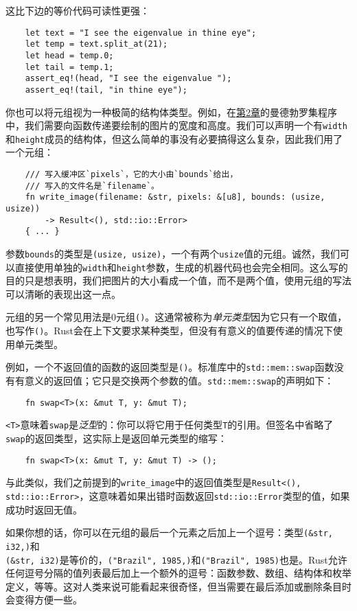 这比下边的等价代码可读性更强：
\begin{verbatim}
    let text = "I see the eigenvalue in thine eye";
    let temp = text.split_at(21);
    let head = temp.0;
    let tail = temp.1;
    assert_eq!(head, "I see the eigenvalue ");
    assert_eq!(tail, "in thine eye");
\end{verbatim}

你也可以将元组视为一种极简的结构体类型。例如，在\hyperref[ch02]{第2章}的曼德勃罗集程序中，我们需要向函数传递要绘制的图片的宽度和高度。我们可以声明一个有\texttt{width}和\texttt{height}成员的结构体，但这么简单的事没有必要搞得这么复杂，因此我们用了一个元组：
\begin{verbatim}
    /// 写入缓冲区`pixels`，它的大小由`bounds`给出，
    /// 写入的文件名是`filename`。
    fn write_image(filename: &str, pixels: &[u8], bounds: (usize, usize))
        -> Result<(), std::io::Error>
    { ... }
\end{verbatim}

参数\texttt{bounds}的类型是\texttt{(usize, usize)}，一个有两个\texttt{usize}值的元组。诚然，我们可以直接使用单独的\texttt{width}和\texttt{height}参数，生成的机器代码也会完全相同。这么写的目的只是想表明，我们把图片的大小看成一个值，而不是两个值，使用元组的写法可以清晰的表现出这一点。

元组的另一个常见用法是0元组\texttt{()}。这通常被称为\emph{单元类型}因为它只有一个取值，也写作\texttt{()}。Rust会在上下文要求某种类型，但没有有意义的值要传递的情况下使用单元类型。

例如，一个不返回值的函数的返回类型是\texttt{()}。标准库中的\texttt{std::mem::swap}函数没有有意义的返回值；它只是交换两个参数的值。\texttt{std::mem::swap}的声明如下：
\begin{verbatim}
    fn swap<T>(x: &mut T, y: &mut T);
\end{verbatim}
\texttt{<T>}意味着\texttt{swap}是\emph{泛型}的：你可以将它用于任何类型\texttt{T}的引用。但签名中省略了\texttt{swap}的返回类型，这实际上是返回单元类型的缩写：
\begin{verbatim}
    fn swap<T>(x: &mut T, y: &mut T) -> ();
\end{verbatim}

与此类似，我们之前提到的\texttt{write\_image}中的返回值类型是\texttt{Result<(), std::io::Error>}，这意味着如果出错时函数返回\texttt{std::io::Error}类型的值，如果成功时返回无值。

如果你想的话，你可以在元组的最后一个元素之后加上一个逗号：类型\texttt{(\&str, i32,)}和\\
\texttt{(\&str, i32)}是等价的，\texttt{("Brazil", 1985,)}和\texttt{("Brazil", 1985)}也是。Rust允许任何逗号分隔的值列表最后加上一个额外的逗号：函数参数、数组、结构体和枚举定义，等等。这对人类来说可能看起来很奇怪，但当需要在最后添加或删除条目时会变得方便一些。

